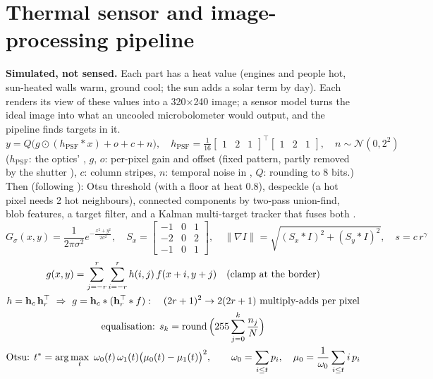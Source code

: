 \section{Thermal sensor and image-processing pipeline}
\label{sec:thermal}
\textbf{Simulated, not sensed.} Each part has a heat value (engines and people hot, sun-heated walls warm, ground cool;
the sun adds a solar term by day). Each  renders its view of these values into a 320$\times$240 image; a sensor model
turns the ideal image into what an uncooled microbolometer would output, and the  pipeline finds
targets in it.
\begin{equation}
y=Q\big(g\odot(h_{\text{PSF}}\ast x)+o+c+n\big),\quad h_{\text{PSF}}=\tfrac1{16}\begin{bmatrix}1&2&1\end{bmatrix}^{\!\top}\!\begin{bmatrix}1&2&1\end{bmatrix},\quad n\sim\mathcal N(0,2^2)
\label{eq:sensor}
\end{equation}
($h_{\text{PSF}}$: the optics' , $g$, $o$: per-pixel gain and offset (fixed pattern, partly removed by the shutter ), $c$: column stripes, $n$:
temporal noise in , $Q$: rounding to 8 bits.) Then (following \cite{gonzalez2018}): Otsu threshold \cite{otsu1979} (with a floor at heat 0.8), despeckle (a hot pixel
needs 2 hot neighbours), connected components by two-pass union-find, blob features, a target filter, and a Kalman
multi-target tracker that fuses both .
\begin{equation}
G_\sigma(x,y)=\frac{1}{2\pi\sigma^2}e^{-\frac{x^2+y^2}{2\sigma^2}},\quad
S_x=\begin{bmatrix}-1&0&1\\-2&0&2\\-1&0&1\end{bmatrix},\quad
\lVert\nabla I\rVert=\sqrt{(S_x\ast I)^2+(S_y\ast I)^2},\quad s=c\,r^\gamma
\label{eq:kernels}
\end{equation}
\begin{gather}
g(x,y)=\sum_{j=-r}^{r}\sum_{i=-r}^{r}h(i,j)\,f(x+i,y+j)\quad\text{(clamp at the border)}\label{eq:conv}\\
h=\vect h_c\,\vect h_r^{\top}\ \Rightarrow\ g=\vect h_c\ast(\vect h_r^{\top}\ast f):\quad (2r+1)^2\to2(2r+1)\ \text{multiply-adds per pixel}\nonumber\\
\text{equalisation: } s_k=\operatorname{round}\Big(255\sum_{j=0}^{k}\frac{n_j}{N}\Big)\nonumber\\
\text{Otsu: } t^\ast=\arg\max_t\ \omega_0(t)\,\omega_1(t)\big(\mu_0(t)-\mu_1(t)\big)^2,\qquad \omega_0=\sum_{i\le t}p_i,\quad \mu_0=\frac{1}{\omega_0}\sum_{i\le t}i\,p_i\nonumber
\end{gather}
